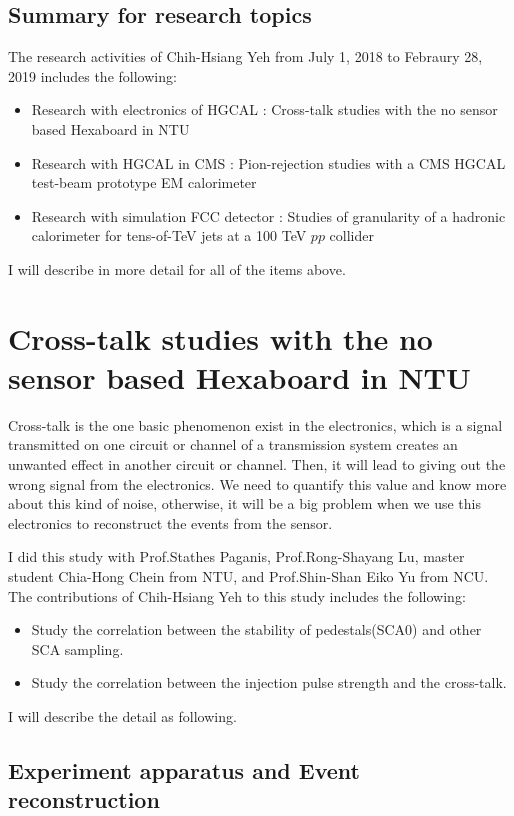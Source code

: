 \subsection{Summary for research topics}
The research activities of Chih-Hsiang Yeh from July 1, 2018 to Febraury 28, 2019 includes the following:
\begin{itemize}
 \item Research with electronics of HGCAL : Cross-talk studies with the no sensor based Hexaboard in NTU 
 \item Research with HGCAL in CMS : Pion-rejection studies with a CMS HGCAL test-beam prototype EM calorimeter
 \item Research with simulation FCC detector : Studies of granularity of a hadronic calorimeter for tens-of-TeV jets at a 100 TeV $pp$ collider
\end{itemize}

I will describe in more detail for all of the items above.
\section{Cross-talk studies with the no sensor based Hexaboard in NTU \label{sec:cross-talk}}
Cross-talk is the one basic phenomenon exist in the electronics, which is a signal transmitted on one circuit or channel of a transmission system creates an unwanted effect in another circuit or channel. Then, it will lead to giving out the wrong signal from the electronics. We need to quantify this value and know more about this kind of noise, otherwise, it will be a big problem when we use this electronics to reconstruct the events from the sensor. 

I did this study with Prof.Stathes Paganis, Prof.Rong-Shayang Lu, master student Chia-Hong Chein from NTU, and Prof.Shin-Shan Eiko Yu from NCU.  The contributions of Chih-Hsiang Yeh to this study includes the following:
\begin{itemize}
\item Study the correlation between the stability of pedestals(SCA0) and other SCA sampling.
\item Study the correlation between the injection pulse strength and the cross-talk.
\end{itemize}
I will describe the detail as following.

\subsection{Experiment apparatus and Event reconstruction}

